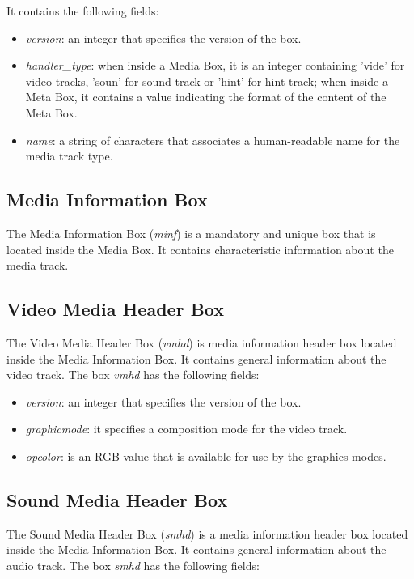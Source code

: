 It contains the following fields:

\begin{itemize}
\item \emph{version}: an integer that specifies the version of the box.
\item \emph{handler\_type}: when inside a Media Box, it is an integer containing 'vide' for video tracks, 'soun' for sound track or 'hint' for hint track; when inside a Meta Box,  it contains a value indicating the format of the content of the Meta Box.
\item \emph{name}: a string of characters that associates a human-readable name for the media track type.
\end{itemize} 

\subsection*{Media Information Box}

The Media Information Box (\emph{minf}) is a mandatory and unique box that is located inside the Media Box. It contains characteristic information about the media track.

\subsection*{Video Media Header Box}

The Video Media Header Box (\emph{vmhd}) is media information header box located inside the Media Information Box. It contains general information about the video track. The box \emph{vmhd} has the following fields:

\begin{itemize}
\item \emph{version}: an integer that specifies the version of the box.
\item \emph{graphicmode}: it specifies a composition mode for the video track.
\item \emph{opcolor}: is an RGB value that is available for use by the graphics modes.
\end{itemize}

\subsection*{Sound Media Header Box}

The Sound Media Header Box (\emph{smhd}) is a media information header box located inside the Media Information Box. It contains general information about the audio track. The box \emph{smhd} has the following fields:

